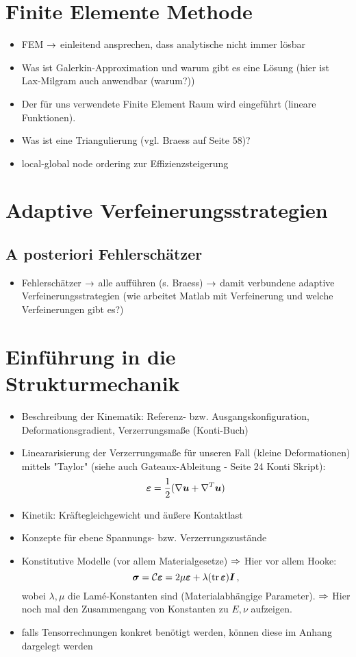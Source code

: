 \section{Finite Elemente Methode}

\begin{itemize}
\item FEM $\rightarrow$ einleitend ansprechen, dass analytische nicht immer lösbar
\item Was ist Galerkin-Approximation und warum gibt es eine Lösung (hier ist Lax-Milgram auch anwendbar (warum?))
\item Der für uns verwendete Finite Element Raum wird eingeführt (lineare Funktionen).
\item Was ist eine Triangulierung (vgl. Braess auf Seite 58)?
\item local-global node ordering zur Effizienzsteigerung
\end{itemize}

\section{Adaptive Verfeinerungsstrategien}

\subsection{A posteriori Fehlerschätzer}

\begin{itemize}
\item Fehlerschätzer $\rightarrow$ alle aufführen (s. Braess) $\rightarrow$ damit verbundene adaptive Verfeinerungsstrategien (wie arbeitet Matlab mit Verfeinerung und welche Verfeinerungen gibt es?)
\end{itemize}

\section{Einführung in die Strukturmechanik}

\begin{itemize}
\item Beschreibung der Kinematik: Referenz- bzw. Ausgangskonfiguration, Deformationsgradient, Verzerrungsmaße (Konti-Buch)
\item Lineararisierung der Verzerrungsmaße für unseren Fall (kleine Deformationen) mittels "Taylor" (siehe auch Gateaux-Ableitung - Seite 24 Konti Skript):
\[
	\boldsymbol {\varepsilon} = \frac 1 2 (\nabla \boldsymbol u + \nabla^T \boldsymbol u)
\]
\item Kinetik: Kräftegleichgewicht und äußere Kontaktlast
\item Konzepte für ebene Spannungs- bzw. Verzerrungszustände
\item Konstitutive Modelle (vor allem Materialgesetze) $\Rightarrow$ Hier vor allem Hooke:
\[
	\boldsymbol \sigma = \mathcal C \boldsymbol {\varepsilon} = 2 \mu \boldsymbol {\varepsilon} + \lambda (\operatorname{tr} \boldsymbol {\varepsilon}) \boldsymbol I \, ,
\]
wobei $\lambda,\mu$ die Lamé-Konstanten sind (Materialabhängige Parameter). $\Rightarrow$ Hier noch mal den Zusammengang von Konstanten zu $E,\nu$ aufzeigen.
\item falls Tensorrechnungen konkret benötigt werden, können diese im Anhang dargelegt werden
\end{itemize}


\newpage

